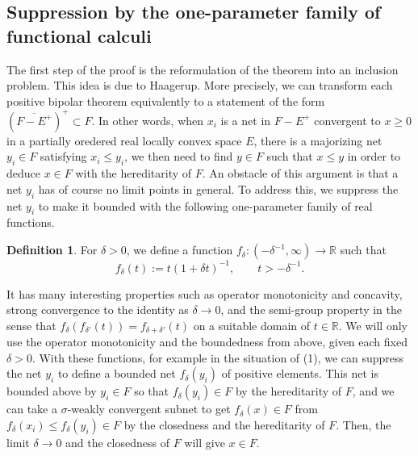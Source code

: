 \documentclass[noamsfonts,a4paper,10pt]{amsart}
\theoremstyle{plain}
\theoremstyle{definition}
\newtheorem{definition}[theorem]{Definition}
\begin{document}
\subsection{Suppression by the one-parameter family of functional calculi}

The first step of the proof is the reformulation of the theorem into an inclusion problem.
This idea is due to Haagerup.
More precisely, we can transform each positive bipolar theorem equivalently to a statement of the form $(\overline{F-E^+})^+\subset F$.
In other words, when $x_i$ is a net in $F-E^+$ convergent to $x\ge0$ in a partially oredered real locally convex space $E$, there is a majorizing net $y_i\in F$ satisfying $x_i\le y_i$, we then need to find $y\in F$ such that $x\le y$ in order to deduce $x\in F$ with the hereditarity of $F$.
An obstacle of this argument is that a net $y_i$ has of course no limit points in general.
To address this, we suppress the net $y_i$ to make it bounded with the following one-parameter family of real functions.
\begin{definition}
For $\delta>0$, we define a function $f_\delta:(-\delta^{-1},\infty)\to\mathbb{R}$ such that
\[f_\delta(t):=t(1+\delta t)^{-1},\qquad t>-\delta^{-1}.\]
\end{definition}
\noindent It has many interesting properties such as operator monotonicity and concavity, strong convergence to the identity as $\delta\to0$, and the semi-group property in the sense that $f_\delta(f_{\delta'}(t))=f_{\delta+\delta'}(t)$ on a suitable domain of $t\in\mathbb{R}$.
We will only use the operator monotonicity and the boundedness from above, given each fixed $\delta>0$.
With these functions, for example in the situation of (1), we can suppress the net $y_i$ to define a bounded net $f_\delta(y_i)$ of positive elements.
This net is bounded above by $y_i\in F$ so that $f_\delta(y_i)\in F$ by the hereditarity of $F$, and we can take a $\sigma$-weakly convergent subnet to get $f_\delta(x)\in F$ from $f_\delta(x_i)\le f_\delta(y_i)\in F$ by the closedness and the hereditarity of $F$.
Then, the limit $\delta\to0$ and the closedness of $F$ will give $x\in F$.
\end{document}
